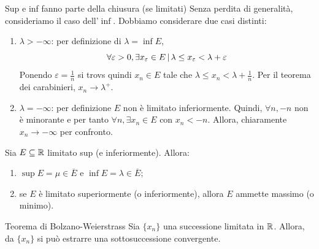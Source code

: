 \documentclass[a4paper]{article}
\begin{document}
\begin{snippetproof}{Sup e inf fanno parte della chiusura (se limitati)}
    Senza perdita di generalità, consideriamo il caso dell'\(\inf\).
    Dobbiamo considerare due casi distinti:
    \begin{enumerate}
        \item \(\lambda > - \infty\): per definizione di \(\lambda = \inf E\),
        \[\forall \varepsilon>0, \exists x_\varepsilon \in E \,|\, \lambda \leq x_\varepsilon < \lambda +\varepsilon\]
        Ponendo \(\varepsilon = \frac{1}{n}\) si trovs quindi \(x_n \in E\) tale che
        \(\lambda \leq x_n < \lambda + \frac{1}{n}\). Per il teorema dei carabinieri,
        \(x_n \to \lambda^+\).
        \item \(\lambda = -\infty\): per definizione \(E\) non è limitato inferiormente.
        Quindi, \(\forall n, -n\) non è minorante e per tanto \(\forall n, \exists x_n \in E\)
        con \(x_n < -n\). Allora, chiaramente \(x_n \to -\infty\) per confronto.
    \end{enumerate}
\end{snippetproof}

\begin{snippetcorollary}{}
    Sia \(E \subseteq \mathbb{R}\) limitato sup (e inferiormente). Allora:
    \begin{enumerate}
        \item \(\sup E = \mu \in \overline{E}\) e \(\inf E = \lambda \in \overline{E}\);
        \item se \(E\) è limitato superiormente (o inferiormente), allora \(E\)
        ammette massimo (o minimo).
    \end{enumerate}
\end{snippetcorollary}

\begin{snippettheorem}{Teorema di Bolzano-Weierstrass}
    Sia \(\{x_n\}\) una successione limitata in \(\mathbb{R}\).
    Allora, da \(\{x_n\}\) si può estrarre una sottosuccessione convergente.  
\end{snippettheorem}
\end{document}
